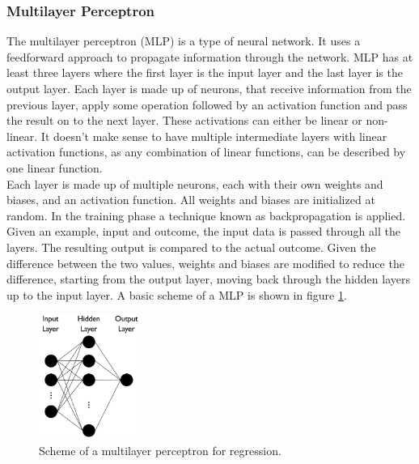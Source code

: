 \subsubsection{Multilayer Perceptron}
The multilayer perceptron (MLP) is a type of neural network. It uses a feedforward approach to propagate information through the network. MLP has at least three layers where the first layer is the input layer and the last layer is the output layer. Each layer is made up of neurons, that receive information from the previous layer, apply some operation followed by an activation function and pass the result on to the next layer. These activations can either be linear or non-linear. It doesn't make sense to have multiple intermediate layers with linear activation functions, as any combination of linear functions, can be described by one linear function. \\
Each layer is made up of multiple neurons, each with their own weights and biases, and an activation function. All weights and biases are initialized at random. In the training phase a technique known as backpropagation is applied. Given an example, input and outcome, the input data is passed through all the layers. The resulting output is compared to the actual outcome. Given the difference between the two values, weights and biases are modified to reduce the difference, starting from the output layer, moving back through the hidden layers up to the input layer. A basic scheme of a MLP is shown in figure \ref{fig:mlpdiag}.

\begin{figure}[h]
\centering
\includegraphics[width=0.3\textwidth]{figures/mlpdiag}
\caption{Scheme of a multilayer perceptron for regression.}
\label{fig:mlpdiag}
\end{figure}


